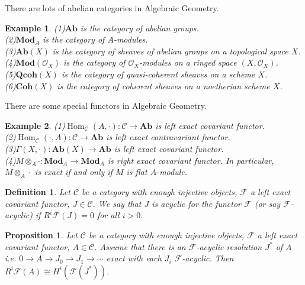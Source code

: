 \documentclass{ctexart}
\newtheorem{definition}{Definition}[section]
\newtheorem{proposition}{Proposition}[section]
\newtheorem{example}{Example}[section]
\renewcommand{\hom}{\operatorname{Hom}}
\newcommand{\abeliangroups}{\mathbf{Ab}}
\newcommand{\module}{\mathbf{Mod}}
\newcommand{\coherent}{\mathbf{Coh}}
\newcommand{\quasicoherent}{\mathbf{Qcoh}}
\begin{document}
There are lots of abelian categories in Algebraic Geometry.
\begin{example}
    (1)$\abeliangroups$ is the category of abelian groups. \\
    (2)$\module_{A}$ is the category of $A$-modules. \\
    (3)$\abeliangroups (X)$ is the category of sheaves of abelian groups on a topological space $X$. \\
    (4)$\module (\mathcal{O}_{X})$ is the category of $\mathcal{O}_{X}$-modules on a ringed space $(X, \mathcal{O}_{X})$. \\
    (5)$\quasicoherent (X)$ is the category of quasi-coherent sheaves on a scheme $X$. \\
    (6)$\coherent (X)$ is the category of coherent sheaves on a noetherian scheme $X$.
\end{example}
There are some special functors in Algebraic Geometry.
\begin{example}
    (1)$\hom_{\mathcal{C}}(A, \cdot): \mathcal{C} \longrightarrow \abeliangroups$ is left exact covariant functor. \\
    (2)$\hom_{\mathcal{C}}(\cdot, A): \mathcal{C} \longrightarrow \abeliangroups$ is left exact contravariant functor. \\
    (3)$\Gamma(X, \cdot): \abeliangroups (X) \longrightarrow \abeliangroups$ is left exact covariant functor. \\
    (4)$M \otimes_{A} \cdot: \module_{A} \longrightarrow \module_{A}$ is right exact covariant functor.
    In particular, $M \otimes_{A} \cdot$ is exact if and only if $M$ is flat $A$-module. 
\end{example}
\begin{definition}
    Let $\mathcal{C}$ be a category with enough injective objects, $\mathcal{F}$ a left exact covariant functor, $J\in \mathcal{C}$.
    We say that $J$ is acyclic for the functor $\mathcal{F}$ (or say $\mathcal{F}$-acyclic) if $R^{i}\mathcal{F}(J) = 0$ for all $i > 0$.
\end{definition}
\begin{proposition}
    Let $\mathcal{C}$ be a category with enough injective objects, $\mathcal{F}$ a left exact covariant functor, $A\in \mathcal{C}$.
    Assume that there is an $\mathcal{F}$-acyclic resolution $J^{\ast}$ of $A$ i.e. $0 \longrightarrow A \longrightarrow J_{0} \longrightarrow J_{1} \longrightarrow \cdots$ exact with each $J_{i}$ $\mathcal{F}$-acyclic.
    Then $R^{i}\mathcal{F}(A) \cong H^{i}(\mathcal{F}(J^{\ast}))$.
    \label{Proposition 7.1}
\end{proposition}
\end{document}
